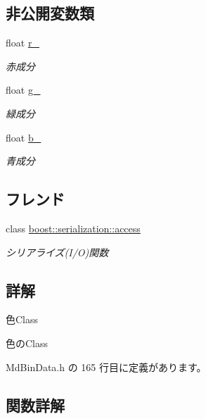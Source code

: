 \subsection*{非公開変数類}
\begin{DoxyCompactItemize}
\item 
float \mbox{\hyperlink{class_md_bin_data_1_1_color_a86af984afebeabe57f5155c1981d9c94}{r\+\_\+}}
\begin{DoxyCompactList}\small\item\em 赤成分 \end{DoxyCompactList}\item 
float \mbox{\hyperlink{class_md_bin_data_1_1_color_a5bdd552987125758d30cbe395909b118}{g\+\_\+}}
\begin{DoxyCompactList}\small\item\em 緑成分 \end{DoxyCompactList}\item 
float \mbox{\hyperlink{class_md_bin_data_1_1_color_a082688900f611ea48822a5b4ccd74afc}{b\+\_\+}}
\begin{DoxyCompactList}\small\item\em 青成分 \end{DoxyCompactList}\end{DoxyCompactItemize}
\subsection*{フレンド}
\begin{DoxyCompactItemize}
\item 
class \mbox{\hyperlink{class_md_bin_data_1_1_color_ac98d07dd8f7b70e16ccb9a01abf56b9c}{boost\+::serialization\+::access}}
\begin{DoxyCompactList}\small\item\em シリアライズ(I/O)関数 \end{DoxyCompactList}\end{DoxyCompactItemize}


\subsection{詳解}
色\+Class 

色の\+Class 

 Md\+Bin\+Data.\+h の 165 行目に定義があります。



\subsection{関数詳解}
\mbox{\label{class_md_bin_data_1_1_color_adbd0c3f5aa7d8026e6d5638a4b42aeb6}} 
